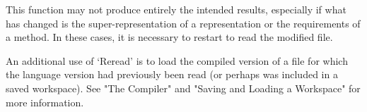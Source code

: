 This function may not produce entirely the intended results,
especially if what has changed is the super-representation of a
representation or the requirements of a method. In these cases, it is
necessary to restart {\GAP} to read the modified file.

An additional use of `Reread' is to load the compiled version of a
file for which the {\GAP} language version had previously been read
(or perhaps was included in a saved workspace). See "The Compiler" and 
"Saving and Loading a Workspace" for more information.


